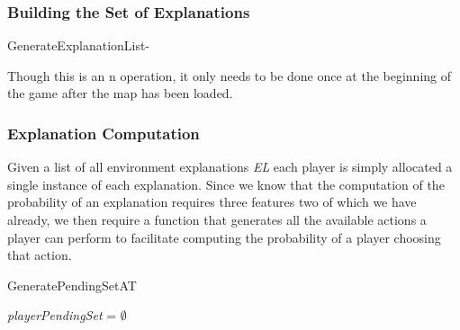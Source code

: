 \documentclass[parskip]{cs4rep}
\begin{document}
\subsubsection{Building the Set of Explanations}

\begin{pseudocode}[ruled]{GenerateExplanationList}{-}
\begin{algorithm}[H]
\end{algorithm}
\end{pseudocode}

Though this is an n operation, it only needs to be done once at the beginning of the game after the map has been loaded.

\subsubsection{Explanation Computation}

Given a list of all environment explanations \textit{EL} each player is simply allocated a single instance of each explanation. Since we know that the computation of the probability of an explanation requires three features two of which we have already, we then require a function that generates all the available actions a player can perform to facilitate computing the probability of a player choosing that action.

\begin{pseudocode}[ruled]{GeneratePendingSet}{AT}
\begin{algorithm}[H]
\textit{playerPendingSet} = $\emptyset$

\end{algorithm}
\end{pseudocode}
\end{document}
